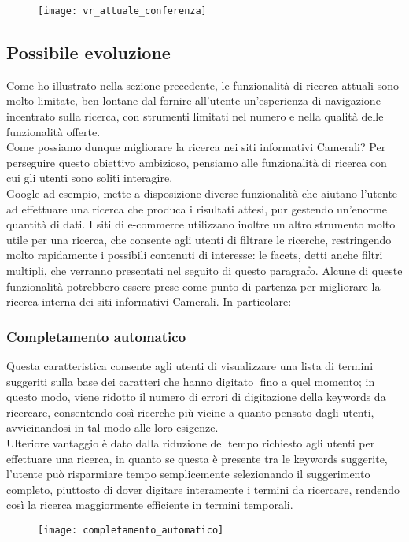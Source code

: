 		\begin{figure}[htbp]
			\label{img:conferenza}
			\begin{center}
				\texttt{[image: vr\_attuale\_conferenza]}
			\end{center}
		\end{figure}
		
		\newpage
		\subsection{Possibile evoluzione}
		Come ho illustrato nella sezione precedente, le funzionalità di ricerca attuali sono molto limitate, ben lontane dal fornire all'utente un'esperienza di navigazione incentrato sulla ricerca, con strumenti limitati nel numero e nella qualità delle funzionalità offerte. \\
		Come possiamo dunque migliorare la ricerca nei siti informativi Camerali?
		Per perseguire questo obiettivo ambizioso, pensiamo alle funzionalità di ricerca con cui gli utenti sono soliti interagire. \\		
		Google ad esempio, mette a disposizione diverse funzionalità che aiutano l’utente ad effettuare una ricerca che produca i risultati attesi, pur gestendo un'enorme quantità di dati. I siti di e-commerce utilizzano inoltre un altro strumento molto utile per una ricerca, che consente agli utenti di filtrare le ricerche, restringendo molto rapidamente i possibili contenuti di interesse: le facets, detti anche filtri multipli, che verranno presentati nel seguito di questo paragrafo. Alcune di queste funzionalità potrebbero essere prese come punto di partenza per migliorare la ricerca interna dei siti informativi Camerali. In particolare:
		
			\subsubsection{Completamento automatico}
			Questa caratteristica consente agli utenti di visualizzare una lista di termini suggeriti sulla base dei caratteri che hanno digitato fino a quel momento; in questo modo, viene ridotto il numero di errori di digitazione della keywords da ricercare, consentendo così ricerche più vicine a quanto pensato dagli utenti, avvicinandosi in tal modo alle loro esigenze. \\ Ulteriore vantaggio è dato dalla riduzione del tempo richiesto agli utenti per effettuare una ricerca, in quanto se questa è presente tra le keywords suggerite, l'utente può risparmiare tempo semplicemente selezionando il suggerimento completo, piuttosto di dover digitare interamente i termini da ricercare, rendendo così la ricerca maggiormente efficiente in termini temporali.
			\begin{figure}[htbp]
				\begin{center}
					\texttt{[image: completamento\_automatico]}
				\end{center}
			\end{figure}
		
